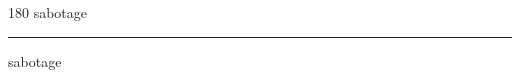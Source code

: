
\begin{frame}
\begin{center}
\begin{turn}{180}
{\fontsize{2.5cm}{1em}\selectfont sabotage}
\end{turn}
\vspace{1em}\par  
\hrule
\vspace{1em}\par  
{\fontsize{2.5cm}{1em}\selectfont sabotage}
\end{center}
\end{frame}
